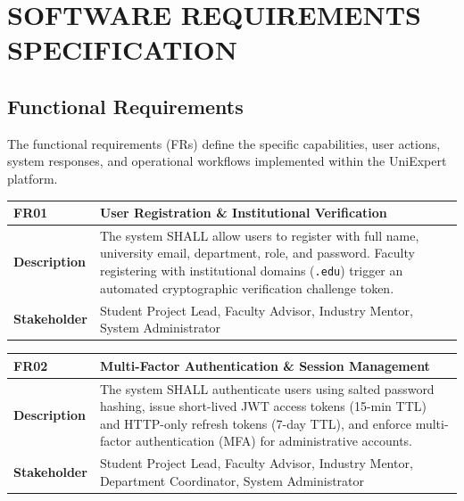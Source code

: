 \chapter{SOFTWARE REQUIREMENTS SPECIFICATION}
\label{ch:srs}

\section{Functional Requirements}
\label{sec:functional_requirements}

The functional requirements (FRs) define the specific capabilities, user actions, system responses, and operational workflows implemented within the UniExpert platform.

\begin{table}[H]
\centering
\small
\begin{tabularx}{\textwidth}{|l|X|}
\hline
\rowcolor{lightgray!40} \textbf{FR01} & \textbf{User Registration \& Institutional Verification} \\ \hline
\textbf{Description} & The system SHALL allow users to register with full name, university email, department, role, and password. Faculty registering with institutional domains (\texttt{.edu}) trigger an automated cryptographic verification challenge token. \\ \hline
\textbf{Stakeholder} & Student Project Lead, Faculty Advisor, Industry Mentor, System Administrator \\ \hline
\end{tabularx}
\end{table}

\begin{table}[H]
\centering
\small
\begin{tabularx}{\textwidth}{|l|X|}
\hline
\rowcolor{lightgray!40} \textbf{FR02} & \textbf{Multi-Factor Authentication \& Session Management} \\ \hline
\textbf{Description} & The system SHALL authenticate users using salted password hashing, issue short-lived JWT access tokens (15-min TTL) and HTTP-only refresh tokens (7-day TTL), and enforce multi-factor authentication (MFA) for administrative accounts. \\ \hline
\textbf{Stakeholder} & Student Project Lead, Faculty Advisor, Industry Mentor, Department Coordinator, System Administrator \\ \hline
\end{tabularx}
\end{table}

